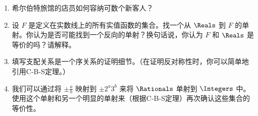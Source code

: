 \begin{enumerate}
    \item 
    希尔伯特旅馆的店员如何容纳可数个新客人？
    \wbvfill
    
    \item 
    设 $F$ 是定义在实数线上的所有实值函数的集合。找一个从 $\Reals$ 到 $F$ 的单射。你认为是否可能找到一个反向的单射？换句话说，你认为 $F$ 和 $\Reals$ 是等价的吗？请解释。
    \wbvfill
    
    \workbookpagebreak
    
    \item 
    填写支配关系是一个序关系的证明细节。（在证明反对称性时，你可以简单地引用C-B-S定理。）
    
    \wbvfill
    
    \item 
    我们可以通过将 $\displaystyle \pm \frac{a}{b}$ 映射到 $\displaystyle \pm 2^a3^b$ 来将 $\Rationals$ 单射到 $\Integers$ 中。使用这个单射和另一个明显的单射来（根据C-B-S定理）再次确认这些集合的等价性。
    \wbvfill
    
    \end{enumerate}
    

